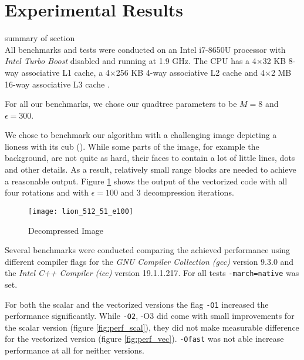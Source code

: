 \section{Experimental Results}\label{sec:exp}

summary of section\\

 All benchmarks and tests were conducted on an Intel
i7-8650U processor with \textit{Intel Turbo Boost} disabled and running at 1.9
GHz. The CPU has a 4$\times$32 KB 8-way associative L1 cache, a 4$\times$256 KB
4-way associative L2 cache and 4$\times$2 MB 16-way associative L3 cache
\cite{intel-opt-manual}.

For all our benchmarks, we chose our quadtree parameters to be $M=8$ and $\epsilon=300$.

We chose to benchmark our algorithm with a challenging image depicting a lioness
with its cub (\cite{lions}). While some parts of the image, for example the
background, are not quite as hard, their faces to contain a lot of little lines,
dots and other details. As a result, relatively small range blocks are needed to
achieve a reasonable output. Figure \ref{fig:lions} shows the output of the
vectorized code with all four rotations and with $\epsilon=100$ and 3
decompression iterations.
\begin{figure}[H]
  \centering
  \texttt{[image: lion\_512\_51\_e100]}
  \caption{Decompressed Image}
  \label{fig:lions}
\end{figure}


 Several benchmarks were conducted comparing the achieved
performance using different compiler flags for the \textit{GNU Compiler
  Collection (gcc)} version 9.3.0 and the \textit{Intel C++ Compiler (icc)}
version 19.1.1.217. For all tests \texttt{-march=native} was set.

For both the scalar and the vectorized versions the flag \texttt{-O1} increased
the performance significantly. While \texttt{-O2}, \textsc{-O3} did come with
small improvements for the scalar version (figure \ref{fig:perf_scal}), they did
not make measurable difference for the vectorized version (figure
\ref{fig:perf_vec}). \texttt{-Ofast} was not able increase performance at all
for neither versions.

